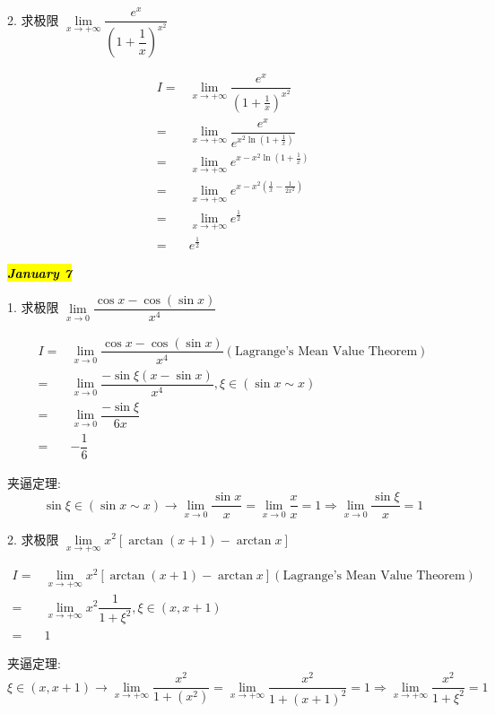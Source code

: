 2. 求极限 $\lim\limits_{x\to +\infty}\dfrac{e^{x}}{(1+\dfrac{1}{x})^{x^{2}}}$
\begin{solution}
	
	\begin{align*}
		I = & \lim\limits_{x\to +\infty}\dfrac{e^{x}}{(1+\frac{1}{x})^{x^{2}}}\\
		  = & \lim\limits_{x\to +\infty}\dfrac{e^{x}}{e^{x^{2}\ln(1+\frac{1}{x})}}\\
		  = & \lim\limits_{x\to +\infty}e^{x-x^{2}\ln(1+\frac{1}{x})}\\
		  = & \lim\limits_{x\to +\infty}e^{x-x^{2}(\frac{1}{x}-\frac{1}{2x^{2}})}\\
		  = & \lim\limits_{x\to +\infty}e^{\frac{1}{2}}\\
		  = & e^{\frac{1}{2}}
	\end{align*}
\end{solution}
\hl{\textbf{\textit{January 7}}}

1. 求极限 $\lim\limits_{x\to 0}\dfrac{\cos x-\cos(\sin x)}{x^{4}}$
\begin{solution}

	\begin{align*}
		I = & \lim\limits_{x\to 0}\dfrac{\cos x-\cos(\sin x)}{x^{4}} (\text{Lagrange's Mean Value Theorem})\\
		  = & \lim\limits_{x\to 0}\dfrac{-\sin \xi(x-\sin x)}{x^{4}}, \xi\in (\sin x\sim x)\\
		  = & \lim\limits_{x\to 0}\dfrac{-\sin \xi}{6x}\\
		  = & -\dfrac{1}{6}
	\end{align*}

	夹逼定理: 
	$$\sin \xi \in (\sin x\sim x)\to \lim\limits_{x\to 0}\dfrac{\sin x}{x} = \lim\limits_{x\to 0}\dfrac{x}{x}=1\Rightarrow \lim\limits_{x\to 0}\dfrac{\sin \xi}{x} = 1$$

\end{solution}

2. 求极限 $\lim\limits_{x\to +\infty}x^{2}\left[\arctan(x+1)-\arctan x\right]$
\begin{solution}

	\begin{align*}
		I = & \lim\limits_{x\to +\infty}x^{2}[\arctan(x+1)-\arctan x](\text{Lagrange's Mean Value Theorem})\\
		  = & \lim\limits_{x\to +\infty}x^{2}\dfrac{1}{1+\xi^{2}},\xi\in(x,x+1)\\
		  = & 1
	\end{align*}

	夹逼定理: 
	$$\xi\in (x, x+1)\to \lim\limits_{x\to +\infty}\frac{x^{2}}{1+(x^{2})} = \lim\limits_{x\to +\infty}\frac{x^{2}}{1+(x+1)^{2}}=1
	\Rightarrow \lim\limits_{x\to +\infty}\frac{x^{2}}{1+\xi^{2}} = 1$$
\end{solution}

